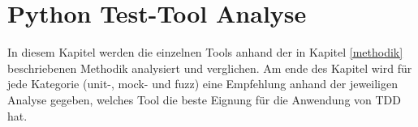 \section{Python Test-Tool Analyse}\label{python-tools}
In diesem Kapitel werden die einzelnen Tools anhand der in Kapitel 
\ref{methodik} beschriebenen Methodik analysiert und verglichen. Am ende des 
Kapitel wird für jede Kategorie (unit-, \gls{mock}- und \gls{fuzz}) eine 
Empfehlung anhand der jeweiligen Analyse gegeben, welches Tool die beste 
Eignung für die Anwendung von TDD hat.




